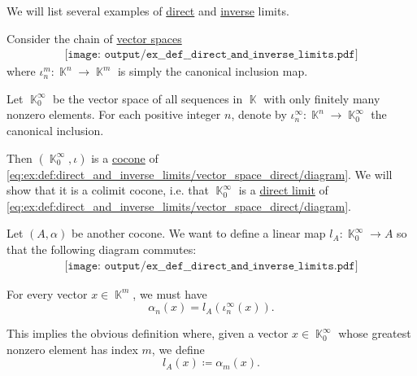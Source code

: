 \begin{example}\label{ex:def:direct_and_inverse_limits}
  We will list several examples of \hyperref[def:direct_and_inverse_limits/direct]{direct} and \hyperref[def:direct_and_inverse_limits/inverse]{inverse} limits.

  \begin{thmenum}
     Consider the chain of \hyperref[def:vector_space]{vector spaces}
    \begin{equation}\label{eq:ex:def:direct_and_inverse_limits/vector_space_direct/diagram}
      \begin{aligned}
        \texttt{[image: output/ex\_\_def\_\_direct\_and\_inverse\_limits.pdf]}
      \end{aligned}
    \end{equation}
    where \( \iota_n^m: \BbbK^n \to \BbbK^m \) is simply the canonical inclusion map.

    Let \( \BbbK_0^\infty \) be the vector space of all sequences in \( \BbbK \) with only finitely many nonzero elements. For each positive integer \( n \), denote by \( \iota_n^\infty: \BbbK^n \to \BbbK_0^\infty \) the canonical inclusion.

    Then \( (\BbbK_0^\infty, \iota) \) is a \hyperref[def:category_of_cones/cocone]{cocone} of \eqref{eq:ex:def:direct_and_inverse_limits/vector_space_direct/diagram}. We will show that it is a colimit cocone, i.e. that \( \BbbK_0^\infty \) is a \hyperref[def:direct_and_inverse_limits]{direct limit} of \eqref{eq:ex:def:direct_and_inverse_limits/vector_space_direct/diagram}.

    Let \( (A, \alpha) \) be another cocone. We want to define a linear map \( l_A: \BbbK_0^\infty \to A \) so that the following diagram commutes:
    \begin{equation}\label{eq:ex:def:direct_and_inverse_limits/vector_space_direct/limit}
      \begin{aligned}
        \texttt{[image: output/ex\_\_def\_\_direct\_and\_inverse\_limits.pdf]}
      \end{aligned}
    \end{equation}

    For every vector \( x \in \BbbK^m \), we must have
    \begin{equation*}
      \alpha_n(x) = l_A(\iota_n^\infty(x)).
    \end{equation*}

    This implies the obvious definition where, given a vector \( x \in \BbbK_0^\infty \) whose greatest nonzero element has index \( m \), we define
    \begin{equation*}
      l_A(x) \coloneqq \alpha_m(x).
    \end{equation*}


\end{thmenum}
\end{example}
